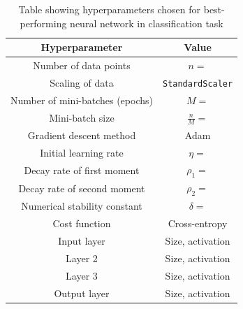 \begin{table}[h!]
  \centering
  \small
  \begin{tabular}{|c|c|}
    \hline
    \textbf{Hyperparameter} & \textbf{Value} \\
    \hline
    Number of data points & $n = $ \\
    \hline
    Scaling of data & \texttt{StandardScaler} \\
    \hline
    Number of mini-batches (epochs) & $M =$ \\
    \hline
    Mini-batch size & $\frac{n}{M} = $ \\
    \hline
    Gradient descent method & Adam \\
    \hline
    Initial learning rate & $\eta = $ \\
    \hline
    Decay rate of first moment & $\rho_1 =$ \\
    \hline
    Decay rate of second moment & $\rho_2 = $ \\
    \hline
    Numerical stability constant & $\delta = $ \\
    \hline
    Cost function & Cross-entropy \\
    \hline
    Input layer & Size, activation \\
    \hline
    Layer 2 & Size, activation \\
    \hline
    Layer 3 & Size, activation \\
    \hline
    Output layer & Size, activation \\
    \hline
  \end{tabular}
  \caption{Table showing hyperparameters chosen for best-performing neural network in classification task}
  \label{tab:classificationtask}
\end{table}


